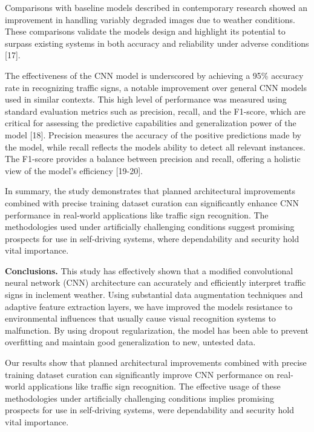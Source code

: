 Comparisons with baseline models described in contemporary research
showed an improvement in handling variably degraded images due to
weather conditions. These comparisons validate the
model\textquotesingle s design and highlight its potential to surpass
existing systems in both accuracy and reliability under adverse
conditions {[}17{]}.

The effectiveness of the CNN model is underscored by achieving a 95\%
accuracy rate in recognizing traffic signs, a notable improvement over
general CNN models used in similar contexts. This high level of
performance was measured using standard evaluation metrics such as
precision, recall, and the F1-score, which are critical for assessing
the predictive capabilities and generalization power of the model
{[}18{]}. Precision measures the accuracy of the positive predictions
made by the model, while recall reflects the model\textquotesingle s
ability to detect all relevant instances. The F1-score provides a
balance between precision and recall, offering a holistic view of the
model's efficiency {[}19-20{]}.

In summary, the study demonstrates that planned architectural
improvements combined with precise training dataset curation can
significantly enhance CNN performance in real-world applications like
traffic sign recognition. The methodologies used under artificially
challenging conditions suggest promising prospects for use in
self-driving systems, where dependability and security hold vital
importance.

{\bfseries Conclusions.} This study has effectively shown that a modified
convolutional neural network (CNN) architecture can accurately and
efficiently interpret traffic signs in inclement weather. Using
substantial data augmentation techniques and adaptive feature extraction
layers, we have improved the model\textquotesingle s resistance to
environmental influences that usually cause visual recognition systems
to malfunction. By using dropout regularization, the model has been able
to prevent overfitting and maintain good generalization to new, untested
data.

Our results show that planned architectural improvements combined with
precise training dataset curation can significantly improve CNN
performance on real-world applications like traffic sign recognition.
The effective usage of these methodologies under artificially
challenging conditions implies promising prospects for use in
self-driving systems, were dependability and security hold vital
importance.

